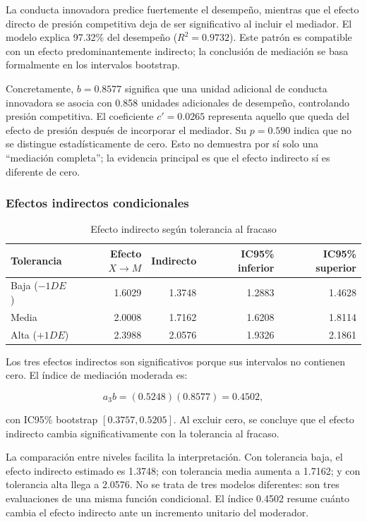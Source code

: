 \documentclass[11pt,letterpaper]{article}
\newcommand{\Rdos}{R^{2}}
\begin{document}
La conducta innovadora predice fuertemente el desempeño, mientras que el efecto directo de presión competitiva deja de ser significativo al incluir el mediador. El modelo explica 97.32\% del desempeño ($\Rdos=0.9732$). Este patrón es compatible con un efecto predominantemente indirecto; la conclusión de mediación se basa formalmente en los intervalos bootstrap.

Concretamente, $b=0.8577$ significa que una unidad adicional de conducta innovadora se asocia con 0.858 unidades adicionales de desempeño, controlando presión competitiva. El coeficiente $c'=0.0265$ representa aquello que queda del efecto de presión después de incorporar el mediador. Su $p=0.590$ indica que no se distingue estadísticamente de cero. Esto no demuestra por sí solo una ``mediación completa''; la evidencia principal es que el efecto indirecto sí es diferente de cero.

\subsubsection*{Efectos indirectos condicionales}

\begin{table}[H]
\centering
\caption{Efecto indirecto según tolerancia al fracaso}
\begin{tabular}{lrrrr}
\toprule
Tolerancia & Efecto $X\rightarrow M$ & Indirecto & IC95\% inferior & IC95\% superior\\
\midrule
Baja ($-1DE$) & 1.6029 & 1.3748 & 1.2883 & 1.4628\\
Media & 2.0008 & 1.7162 & 1.6208 & 1.8114\\
Alta ($+1DE$) & 2.3988 & 2.0576 & 1.9326 & 2.1861\\
\bottomrule
\end{tabular}
\end{table}

Los tres efectos indirectos son significativos porque sus intervalos no contienen cero. El índice de mediación moderada es:

\[
a_3b=(0.5248)(0.8577)=0.4502,
\]

con IC95\% bootstrap $[0.3757,0.5205]$. Al excluir cero, se concluye que el efecto indirecto cambia significativamente con la tolerancia al fracaso.

La comparación entre niveles facilita la interpretación. Con tolerancia baja, el efecto indirecto estimado es 1.3748; con tolerancia media aumenta a 1.7162; y con tolerancia alta llega a 2.0576. No se trata de tres modelos diferentes: son tres evaluaciones de una misma función condicional. El índice 0.4502 resume cuánto cambia el efecto indirecto ante un incremento unitario del moderador.
\end{document}
